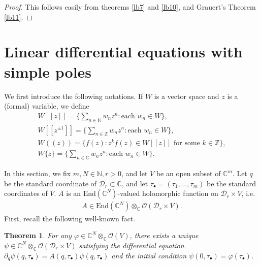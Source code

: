 \documentclass[12pt,a4paper,notitlepage]{report}
\theoremstyle{definition}
\theoremstyle{plain}
\newtheorem{thm}[df]{Theorem}
\newcommand{\mc}{\mathcal}
\newcommand{\End}{\mathrm{End}} %
\newcommand{\scr}{\mathscr}
\newcommand{\mbb}{\mathbb}
\newcommand{\blt}{\bullet}
\newcommand{\Cbb}{\mathbb C}
\numberwithin{equation}{section}
\begin{document}
\begin{proof}
This follows easily from theorems \ref{lb7} and \ref{lb10},  and Grauert's Theorem \ref{lb11}.
\end{proof}




\section{Linear differential equations with simple poles}


We first introduce the following notations. If $W$ is a vector space and $z$ is a (formal) variable, we  define 
\begin{gather*}
W[[z]]=\bigg\{\sum_{n\in\mathbb N}w_nz^n:\text{each }w_n\in W\bigg\},\\
W[[z^{\pm 1}]]=\bigg\{\sum_{n\in\mathbb Z}w_nz^n:\text{each }w_n\in W\bigg\},\\
W((z))=\Big\{f(z):z^kf(z)\in W[[z]]\text{ for some }k\in\mbb Z \Big\},\\
W\{z\}=\Big\{\sum_{n\in\mbb C}w_nz^n :\text{each $w_n\in W$}\Big\}.
\end{gather*}


In this section, we fix $m,N\in\mbb N,r>0$, and let $V$ be an open subset of $\mbb C^m$. Let $q$ be the standard coordinate of $\mc D_r\subset\mbb C$, and let $\tau_\blt=(\tau_1,\dots,\tau_m)$ be the standard coordinates of $V$. $A$ is an $\End(\Cbb^N)$-valued holomorphic function on $\mc D_r\times V$, i.e.
\begin{align*}
A\in\End(\Cbb^N)\otimes_\Cbb\scr O(\mc D_r\times V).
\end{align*}
First, recall the following well-known fact.


\begin{thm}\label{lb12}
For any  $\varphi\in\Cbb^N\otimes_\Cbb\scr O(V)$, there exists a unique  $\psi\in\Cbb^N\otimes_\Cbb\scr O(\mc D_r\times V)$ satisfying the differential equation $\partial_q\psi(q,\tau_\blt)=A(q,\tau_\blt)\psi(q,\tau_\blt)$ and the initial condition $\psi(0,\tau_\blt)=\varphi(\tau_\blt)$. 
\end{thm}
\end{document}

